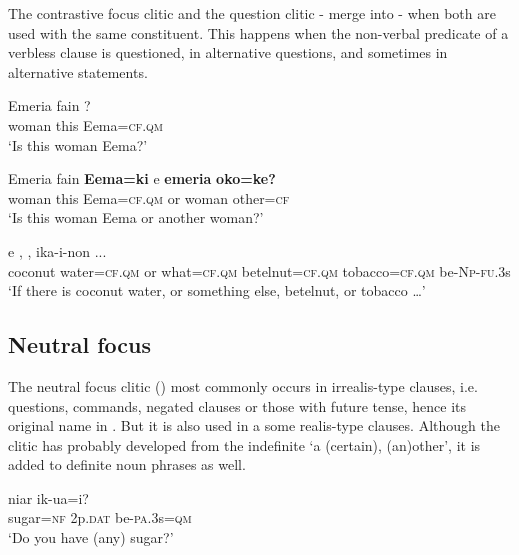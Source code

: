 The contrastive focus clitic and the question clitic - merge into - when both are used with the same constituent. This happens when the non-verbal predicate of a verbless clause is questioned, in alternative questions, and sometimes in alternative statements.

\ea%
\label{ex:x1716}
\gll Emeria  fain  ? \\
woman  this  Eema=\textsc{cf}.\textsc{qm}      \\
\glt`Is this woman Eema?'
\z


\ea%
\label{ex:x1718}
\gll Emeria  fain  \textbf{Eema=ki} e  \textbf{emeria} \textbf{oko=ke?}\\
woman  this  Eema=\textsc{cf}.\textsc{qm}  or  woman  other=\textsc{cf}\\
\glt`Is this woman Eema or another woman?'
\z


\ea%
\label{ex:x1717}
\gll {}     e  ,  ,   ika-i-non  ...\\
coconut  water=\textsc{cf}.\textsc{qm}  or  what=\textsc{cf}.\textsc{qm}  betelnut=\textsc{cf}.\textsc{qm} tobacco=\textsc{cf}.\textsc{qm}  be-\textsc{Np}-\textsc{fu}.3s     \\
\glt`If there is coconut water, or something else, betelnut, or tobacco {\dots}'
\z


\subsection{Neutral focus} 

The neutral focus clitic () most commonly occurs in irrealis-type clauses, i.e. questions, commands, negated clauses or those with future tense, hence its original name in \citet{Jarvinen1988b}. But it is also used in a some realis-type clauses. Although the clitic has probably developed from the indefinite  `a (certain), (an)other', it is added to definite noun phrases as well. 

\ea%
\label{ex:x1719}
\gll {}  niar  ik-ua=i? \\
sugar=\textsc{nf}  2p.\textsc{dat}  be-\textsc{pa}.3s=\textsc{qm}      \\
\glt`Do you have (any) sugar?'
\z


